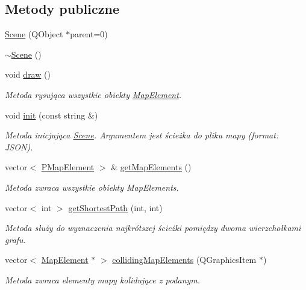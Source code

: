 \subsection*{Metody publiczne}
\begin{DoxyCompactItemize}
\item 
\hyperlink{class_scene_a4b30c21fd0065d816fdf1e51fe67a4fd}{Scene} (Q\-Object $\ast$parent=0)
\item 
\hyperlink{class_scene_a3b8cec2e32546713915f8c6303c951f1}{$\sim$\-Scene} ()
\item 
void \hyperlink{class_scene_ac0e3d2c98ba6063a086467fb2c19142f}{draw} ()
\begin{DoxyCompactList}\small\item\em Metoda rysująca wszystkie obiekty \hyperlink{class_map_element}{Map\-Element}. \end{DoxyCompactList}\item 
void \hyperlink{class_scene_a848776d5d67d321587b102c3a6f10a11}{init} (const string \&)
\begin{DoxyCompactList}\small\item\em Metoda inicjująca \hyperlink{class_scene}{Scene}. Argumentem jest ścieżka do pliku mapy (format\-: J\-S\-O\-N). \end{DoxyCompactList}\item 
vector$<$ \hyperlink{_types_8h_a4260a5280323637f8a1fa28e89b6ef14}{P\-Map\-Element} $>$ \& \hyperlink{class_scene_a00b47fa58618a2144393413935f65561}{get\-Map\-Elements} ()
\begin{DoxyCompactList}\small\item\em Metoda zwraca wszystkie obiekty Map\-Elements. \end{DoxyCompactList}\item 
vector$<$ int $>$ \hyperlink{class_scene_a14e5edf4c038b83e77f0980f0c77b849}{get\-Shortest\-Path} (int, int)
\begin{DoxyCompactList}\small\item\em Metoda służy do wyznaczenia najkrótszej ścieżki pomiędzy dwoma wierzchołkami grafu. \end{DoxyCompactList}\item 
vector$<$ \hyperlink{class_map_element}{Map\-Element} $\ast$ $>$ \hyperlink{class_scene_a4f6fb72b97821a0542e0da2f68e807b3}{colliding\-Map\-Elements} (Q\-Graphics\-Item $\ast$)
\begin{DoxyCompactList}\small\item\em Metoda zwraca elementy mapy kolidujące z podanym. \end{DoxyCompactList}\item 

\end{DoxyCompactItemize}
